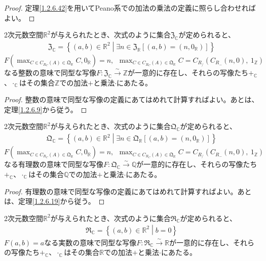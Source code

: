 \documentclass[dvipdfmx]{jsarticle}
\begin{document}
\begin{proof}
定理\ref{1.2.6.42}を用いてPeano系での加法の乗法の定義に照らし合わせればよい。
\end{proof}
\begin{thm}\label{1.2.6.45}
2次元数空間$\mathbb{R}^{2}$が与えられたとき、次式のように集合$\mathfrak{Z}_{\mathbb{C}}$が定められると、
\begin{align*}
\mathfrak{Z}_{\mathbb{C}} = \left\{ (a,b) \in \mathbb{R}^{2} \middle| \exists n \in \mathfrak{Z}_{\mathbb{R}}\left[ (a,b) = \left( n,0_{\mathbb{R}} \right) \right] \right\}
\end{align*}
$F\left( \max_{C \in C_{R_{C}}(A) \in \mathfrak{Q}_{\mathbb{R}}}C,0_{\mathbb{R}} \right) = n,\ \ \max_{C \in C_{R_{C}}(A) \in \mathfrak{Q}_{\mathbb{R}}}C = C_{R_{/}}\left( C_{R_{-}}(n,0),\ 1_{\mathbb{Z}} \right)$なる整数の意味で同型な写像$F:\mathfrak{Z}_{\mathbb{C}}\overset{\sim}{\rightarrow}\mathbb{Z}$が一意的に存在し、それらの写像たち$+_{\mathbb{C}}$、$\cdot_{\mathbb{C}}$はその集合$\mathbb{Z}$での加法$+$と乗法$\cdot$にあたる。
\end{thm}
\begin{proof}
整数の意味で同型な写像の定義にあてはめれて計算すればよい。あとは、定理\ref{1.2.6.9}から従う。
\end{proof}
\begin{thm}\label{1.2.6.46}
2次元数空間$\mathbb{R}^{2}$が与えられたとき、次式のように集合$\mathfrak{Q}_{\mathbb{C}}$が定められると、
\begin{align*}
\mathfrak{Q}_{\mathbb{C}} = \left\{ (a,b) \in \mathbb{R}^{2} \middle| \exists n \in \mathfrak{Q}_{\mathbb{R}}\left[ (a,b) = \left( n,0_{\mathbb{R}} \right) \right] \right\}
\end{align*}
$F\left( \max_{C \in C_{R_{C}}(A) \in \mathfrak{Q}_{\mathbb{R}}}C,0_{\mathbb{R}} \right) = n,\ \ \max_{C \in C_{R_{C}}(A) \in \mathfrak{Q}_{\mathbb{R}}}C = C_{R_{/}}\left( C_{R_{-}}(n,0),\ 1_{\mathbb{Z}} \right)$なる有理数の意味で同型な写像$F:\mathfrak{Q}_{\mathbb{C}}\overset{\sim}{\rightarrow}\mathbb{Q}$が一意的に存在し、それらの写像たち$+_{\mathbb{C}}$、$\cdot_{\mathbb{C}}$はその集合$\mathbb{Q}$での加法$+$と乗法$\cdot$にあたる。
\end{thm}
\begin{proof}
有理数の意味で同型な写像の定義にあてはめれて計算すればよい。あとは、定理\ref{1.2.6.19}から従う。
\end{proof}
\begin{thm}\label{1.2.6.47}
2次元数空間$\mathbb{R}^{2}$が与えられたとき、次式のように集合$\mathfrak{R}_{\mathbb{C}}$が定められると、
\begin{align*}
\mathfrak{R}_{\mathbb{C}} = \left\{ (a,b) \in \mathbb{R}^{2} \middle| b = 0 \right\}
\end{align*}
$F(a,b) = a$なる実数の意味で同型な写像$F:\mathfrak{R}_{\mathbb{C}}\overset{\sim}{\rightarrow}\mathbb{R}$が一意的に存在し、それらの写像たち$+_{\mathbb{C}}$、$\cdot_{\mathbb{C}}$はその集合$\mathbb{R}$での加法$+$と乗法$\cdot$にあたる。
\end{thm}
\end{document}
